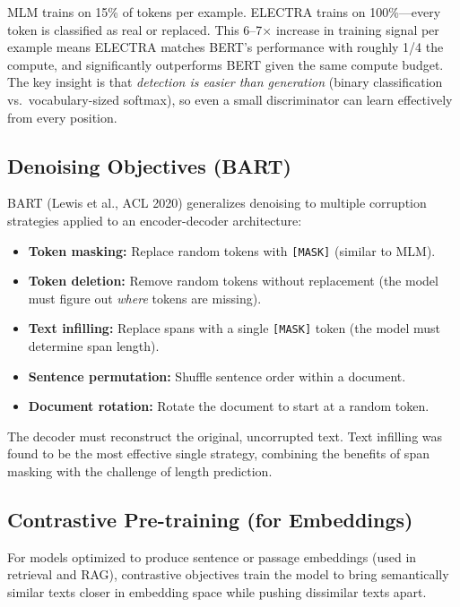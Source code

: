 \begin{keyinsight}
MLM trains on 15\% of tokens per example.  ELECTRA trains on 100\%---every
token is classified as real or replaced.  This 6--7$\times$ increase in
training signal per example means ELECTRA matches BERT's performance with
roughly 1/4 the compute, and significantly outperforms BERT given the same
compute budget.  The key insight is that \emph{detection is easier than
generation} (binary classification vs.\ vocabulary-sized softmax), so even a
small discriminator can learn effectively from every position.
\end{keyinsight}

\subsection{Denoising Objectives (BART)}

BART (Lewis et al., ACL 2020) generalizes denoising to multiple corruption
strategies applied to an encoder-decoder architecture:

\begin{itemize}
    \item \textbf{Token masking:} Replace random tokens with \texttt{[MASK]}
          (similar to MLM).
    \item \textbf{Token deletion:} Remove random tokens without replacement
          (the model must figure out \emph{where} tokens are missing).
    \item \textbf{Text infilling:} Replace spans with a single \texttt{[MASK]}
          token (the model must determine span length).
    \item \textbf{Sentence permutation:} Shuffle sentence order within a document.
    \item \textbf{Document rotation:} Rotate the document to start at a random
          token.
\end{itemize}

The decoder must reconstruct the original, uncorrupted text.  Text infilling
was found to be the most effective single strategy, combining the benefits
of span masking with the challenge of length prediction.

\subsection{Contrastive Pre-training (for Embeddings)}

For models optimized to produce sentence or passage embeddings (used in
retrieval and RAG), contrastive objectives train the model to bring
semantically similar texts closer in embedding space while pushing
dissimilar texts apart.


